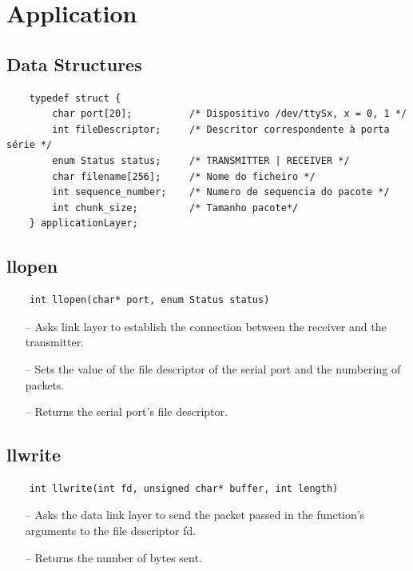 \documentclass[11pt]{report}
\begin{document}
\section{Application} 

\subsection{Data Structures}

\begin{verbatim}
    typedef struct {
        char port[20];          /* Dispositivo /dev/ttySx, x = 0, 1 */
        int fileDescriptor;     /* Descritor correspondente à porta série */
        enum Status status;     /* TRANSMITTER | RECEIVER */
        char filename[256];     /* Nome do ficheiro */
        int sequence_number;    /* Numero de sequencia do pacote */
        int chunk_size;         /* Tamanho pacote*/
    } applicationLayer;
\end{verbatim}

\subsection{llopen}

\begin{verbatim}
    int llopen(char* port, enum Status status)
\end{verbatim}
\begin{itemize}
	\item[--] Asks link layer to establish the connection between the receiver and the transmitter.
    \item[--] Sets the value of the file descriptor of the serial port and the numbering of packets.
    \item[--] Returns the serial port's file descriptor.
\end{itemize}

\subsection{llwrite}

\begin{verbatim}
    int llwrite(int fd, unsigned char* buffer, int length)
\end{verbatim}
\begin{itemize}
    \item[--] Asks the data link layer to send the packet passed in the function's arguments to the file descriptor fd.
    \item[--] Returns the number of bytes sent.
\end{itemize}
\end{document}
